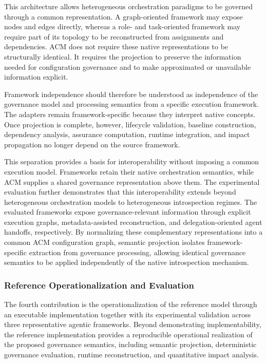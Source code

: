 \documentclass[10pt]{article}
\begin{document}
This architecture allows heterogeneous orchestration paradigms to be governed through a common representation. A graph-oriented framework may expose nodes and edges directly, whereas a role- and task-oriented framework may require part of its topology to be reconstructed from assignments and dependencies. ACM does not require these native representations to be structurally identical. It requires the projection to preserve the information needed for configuration governance and to make approximated or unavailable information explicit.

Framework independence should therefore be understood as independence of the governance model and processing semantics from a specific execution framework. The adapters remain framework-specific because they interpret native concepts. Once projection is complete, however, lifecycle validation, baseline construction, dependency analysis, assurance computation, runtime integration, and impact propagation no longer depend on the source framework.

This separation provides a basis for interoperability without imposing a common execution model. Frameworks retain their native orchestration semantics, while ACM supplies a shared governance representation above them.
The experimental evaluation further demonstrates that this interoperability extends beyond heterogeneous orchestration models to heterogeneous introspection regimes. The evaluated frameworks expose governance-relevant information through explicit execution graphs, metadata-assisted reconstruction, and delegation-oriented agent handoffs, respectively. By normalizing these complementary representations into a common ACM configuration graph, semantic projection isolates framework-specific extraction from governance processing, allowing identical governance semantics to be applied independently of the native introspection mechanism.

\subsubsection{Reference Operationalization and Evaluation}

The fourth contribution is the operationalization of the reference model through an executable implementation together with its experimental validation across three representative agentic frameworks. Beyond demonstrating implementability, the reference implementation provides a reproducible operational realization of the proposed governance semantics, including semantic projection, deterministic governance evaluation, runtime reconstruction, and quantitative impact analysis.
\end{document}
